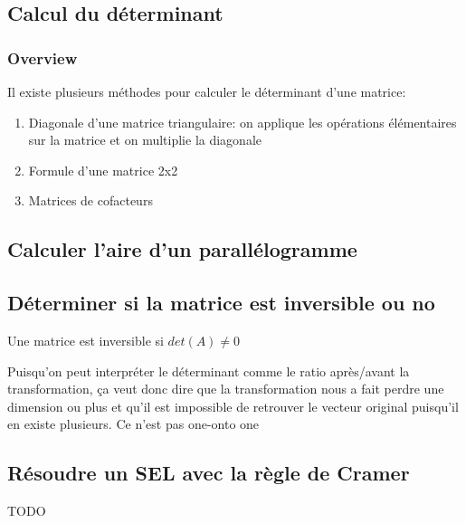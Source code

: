 \documentclass{article}
\begin{document}
\subsection{Calcul du déterminant}%
\label{sub:Calcul du déterminant}

\subsubsection{Overview}%
\label{ssub:Overview}

Il existe plusieurs méthodes pour calculer le déterminant d'une matrice:
\begin{enumerate}
    \item Diagonale d'une matrice triangulaire: on applique les opérations
	élémentaires sur la matrice et on multiplie la diagonale
    \item Formule d'une matrice 2x2
    \item Matrices de cofacteurs
\end{enumerate}

\subsection{Calculer l'aire d'un parallélogramme}

\subsection{Déterminer si la matrice est inversible ou no}

\begin{theorem}
    Une matrice est inversible si $det(A) \neq 0$
\end{theorem}

\begin{intuition}
    Puisqu'on peut interpréter le déterminant comme le ratio après/avant la
    transformation, ça veut donc dire que la transformation nous a fait
    perdre une dimension ou plus et qu'il est impossible de retrouver
    le vecteur original puisqu'il en existe plusieurs. Ce n'est pas one-onto
    one
\end{intuition}

\subsection{Résoudre un SEL avec la règle de Cramer}

\begin{remark}
    TODO
\end{remark}
\end{document}
